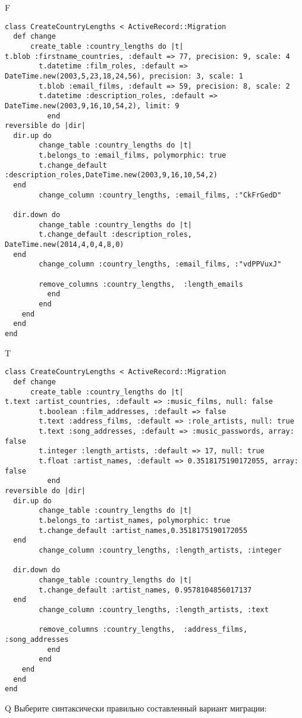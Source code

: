 F
\begin{verbatim}
class CreateCountryLengths < ActiveRecord::Migration
  def change
	  create_table :country_lengths do |t|
t.blob :firstname_countries, :default => 77, precision: 9, scale: 4
		t.datetime :film_roles, :default => DateTime.new(2003,5,23,18,24,56), precision: 3, scale: 1
		t.blob :email_films, :default => 59, precision: 8, scale: 2
		t.datetime :description_roles, :default => DateTime.new(2003,9,16,10,54,2), limit: 9
		  end
reversible do |dir|
  dir.up do
		change_table :country_lengths do |t|
		t.belongs_to :email_films, polymorphic: true
 		t.change_default :description_roles,DateTime.new(2003,9,16,10,54,2)
  end
 		change_column :country_lengths, :email_films, :"CkFrGedD"
   
  dir.down do
		change_table :country_lengths do |t|
		t.change_default :description_roles, DateTime.new(2014,4,0,4,8,0)
  end
 		change_column :country_lengths, :email_films, :"vdPPVuxJ"
   
		remove_columns :country_lengths,  :length_emails 
	      end
	    end
    end 
  end
end

\end{verbatim}

T
\begin{verbatim}
class CreateCountryLengths < ActiveRecord::Migration
  def change
	  create_table :country_lengths do |t|
t.text :artist_countries, :default => :music_films, null: false
		t.boolean :film_addresses, :default => false
		t.text :address_films, :default => :role_artists, null: true
		t.text :song_addresses, :default => :music_passwords, array: false
		t.integer :length_artists, :default => 17, null: true
		t.float :artist_names, :default => 0.3518175190172055, array: false
		  end
reversible do |dir|
  dir.up do
		change_table :country_lengths do |t|
		t.belongs_to :artist_names, polymorphic: true
 		t.change_default :artist_names,0.3518175190172055
  end
 		change_column :country_lengths, :length_artists, :integer
   
  dir.down do
		change_table :country_lengths do |t|
		t.change_default :artist_names, 0.9578104856017137
  end
 		change_column :country_lengths, :length_artists, :text
   
		remove_columns :country_lengths,  :address_films, :song_addresses 
	      end
	    end
    end 
  end
end

\end{verbatim}

Q
Выберите синтаксически правильно составленный вариант миграции:

